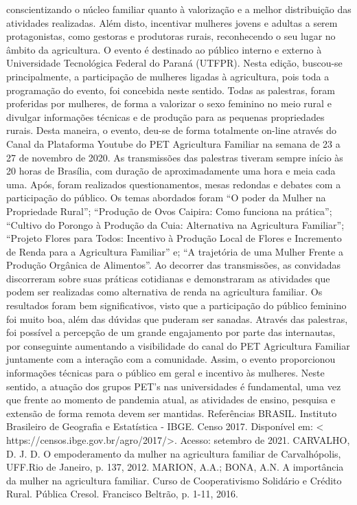 conscientizando o núcleo familiar quanto à valorização e a melhor distribuição das atividades 
realizadas. Além disto, incentivar mulheres jovens e adultas a serem protagonistas, como gestoras 
e produtoras rurais, reconhecendo o seu lugar no âmbito da agricultura.
O evento é destinado ao público interno e externo à Universidade Tecnológica Federal do 
Paraná (UTFPR). Nesta edição, buscou-se principalmente, a participação de mulheres ligadas à 
agricultura, pois toda a programação do evento, foi concebida neste sentido. Todas as palestras, 
foram proferidas por mulheres, de forma a valorizar o sexo feminino no meio rural e divulgar 
informações técnicas e de produção para as pequenas propriedades rurais. Desta maneira, o evento, 
deu-se de forma totalmente on-line através do Canal da Plataforma Youtube do PET Agricultura 
Familiar na semana de 23 a 27 de novembro de 2020. As transmissões das palestras tiveram sempre 
início às 20 horas de Brasília, com duração de aproximadamente uma hora e meia cada uma. Após, 
foram realizados questionamentos, mesas redondas e debates com a participação do público. 
Os temas abordados foram “O poder da Mulher na Propriedade Rural”; “Produção de Ovos 
Caipira: Como funciona na prática”; “Cultivo do Porongo à Produção da Cuia: Alternativa na 
Agricultura Familiar”; “Projeto Flores para Todos: Incentivo à Produção Local de Flores e 
Incremento de Renda para a Agricultura Familiar” e; “A trajetória de uma Mulher Frente a 
Produção Orgânica de Alimentos”.
Ao decorrer das transmissões, as convidadas discorreram sobre suas práticas cotidianas e 
demonstraram as atividades que podem ser realizadas como alternativa de renda na agricultura 
familiar. Os resultados foram bem significativos, visto que a participação do público feminino foi 
muito boa, além das dúvidas que puderam ser sanadas. Através das palestras, foi possível a 
percepção de um grande engajamento por parte das internautas, por conseguinte aumentando a 
visibilidade do canal do PET Agricultura Familiar juntamente com a interação com a comunidade.
Assim, o evento proporcionou informações técnicas para o público em geral e incentivo 
às mulheres. Neste sentido, a atuação dos grupos PET’s nas universidades é fundamental, uma 
vez que frente ao momento de pandemia atual, as atividades de ensino, pesquisa e extensão de 
forma remota devem ser mantidas.
Referências 
BRASIL. Instituto Brasileiro de Geografia e Estatística - IBGE. Censo 2017. Disponível em: <
https://censos.ibge.gov.br/agro/2017/>. Acesso: setembro de 2021.
CARVALHO, D. J. D. O empoderamento da mulher na agricultura familiar de Carvalhópolis, 
UFF.Rio de Janeiro, p. 137, 2012.
MARION, A.A.; BONA, A.N. A importância da mulher na agricultura familiar. Curso de 
Cooperativismo Solidário e Crédito Rural. Pública Cresol. Francisco Beltrão, p. 1-11, 2016.

